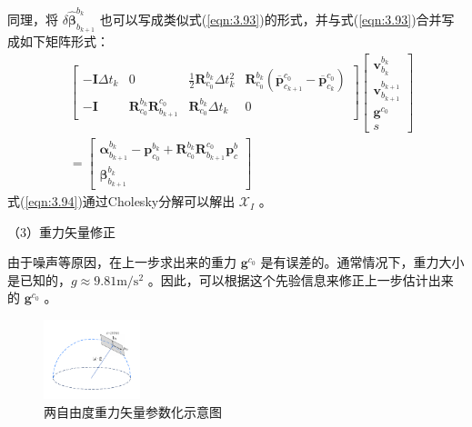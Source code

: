 同理，将 $\delta \hat{\bm{\beta}}_{b_{k+1}}^{b_{k}} $ 也可以写成类似式(\ref{eqn:3.93})的形式，并与式(\ref{eqn:3.93})合并写成如下矩阵形式：
\begin{equation}
\label{eqn:3.94}
\begin{aligned}
& \left[ \begin{array}{cccc}
- \mathbf{I} \Delta t_{k} & 0 & \frac{1}{2} \mathbf{R}_{c_{0}}^{b_{k}} \Delta t_{k}^{2} & \mathbf{R}_{c_{0}}^{b_{k}}(\overline{\mathbf{p}}_{c_{k+1}}^{c_{0}}-\overline{\mathbf{p}}_{c_{k}}^{c_{0}}) \\
{- \mathbf{ I}} & {\mathbf{R}_{c_{0}}^{b_{k}} \mathbf{R}_{b_{k+1}}^{c_{0}}} & {\mathbf{R}_{c_{0}}^{b_{k}} \Delta t_{k}} & {0}
\end{array}\right] 
\left[ \begin{array}{c}
{\mathbf{v}_{b_{k}}^{b_{k}}} \\ {\mathbf{v}_{b_{k+1}}^{b_{k+1}}} \\ {\mathbf{g}^{c_{0}}} \\ s
\end{array}\right] \\
&=\left[ \begin{array}{c}
\bm{\alpha}_{b_{k+1}}^{b_{k}}-\mathbf{p}_{c_{0}}^{b_{k}} + \mathbf{R}^{b_k}_{c_0}\mathbf{R}_{b_{k+1}}^{c_{0}} \mathbf{p}_{c}^{b} \\
{\bm{\beta}_{b_{k+1}}^{b_{k}}}
\end{array}\right]
\end{aligned}
\end{equation}
式(\ref{eqn:3.94})通过Cholesky分解可以解出 $\mathcal{X}_I $ 。

（3）重力矢量修正

由于噪声等原因，在上一步求出来的重力 $\mathbf{g}^{c_0} $ 是有误差的。通常情况下，重力大小是已知的，$g \approx 9.81 \mathrm{m} / \mathrm{s}^{2} $ 。因此，可以根据这个先验信息来修正上一步估计出来的 $\mathbf{g}^{c_0} $ 。
\begin{figure}[h]\setlength{\belowcaptionskip}{-12pt}
	\centering
	\includegraphics[width=0.25\textwidth, angle=-90]{figures/chapter3/fig3_13}
	\caption{两自由度重力矢量参数化示意图}\label{fig3_13}
\end{figure}

